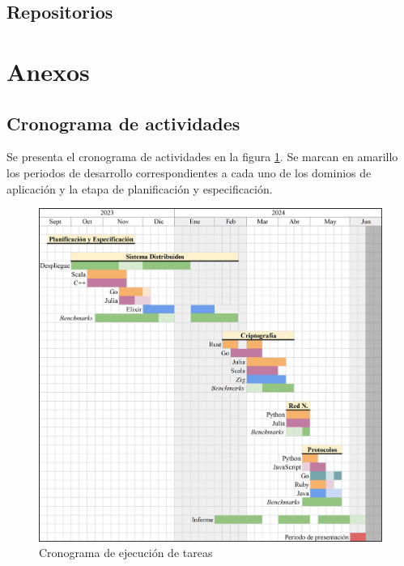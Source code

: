 \documentclass[11pt]{article}
\let\Oldsection\section
\renewcommand{\section}{\FloatBarrier\Oldsection}
\let\Oldsubsection\subsection
\renewcommand{\subsection}{\FloatBarrier\Oldsubsection}
\begin{document}
\subsection{Repositorios}

\begingroup
\raggedright
\printbibliography[keyword={repos},nottype=unused,heading=none]
\nocite{*} %
\endgroup

\section{Anexos}

\subsection{Cronograma de actividades} \label{sec:annex:schedule}

Se presenta el cronograma de actividades en la figura \ref{tab:anex:cron}. Se marcan en amarillo los periodos de desarrollo correspondientes a cada uno de los dominios de aplicación y la etapa de planificación y especificación.

\begin{figure}
    \centering
    \includegraphics[width=\textwidth]{resources/cronograma.jpg}
    \caption{Cronograma de ejecución de tareas}
    \label{tab:anex:cron}
\end{figure}
\end{document}
